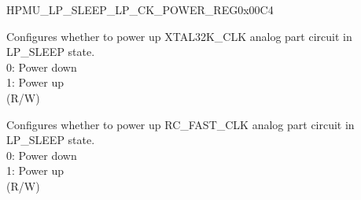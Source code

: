     \begin{register}{H}{PMU\_LP\_SLEEP\_LP\_CK\_POWER\_REG}{0x00C4}\label{regdesc:PMULPSLEEPLPCKPOWERREG}
    \regnewline%
    \begin{regdesc}\begin{reglist}
    \label{fielddesc:PMULPSLEEPXPDXTAL32K}\item [PMU\_LP\_SLEEP\_XPD\_XTAL32K] Configures whether to power up XTAL32K\_CLK analog part circuit in LP\_SLEEP state.\\
0: Power down\\
1: Power up\\
(R/W)
    \label{fielddesc:PMULPSLEEPXPDFOSCCLK}\item [PMU\_LP\_SLEEP\_XPD\_FOSC\_CLK] Configures whether to power up RC\_FAST\_CLK analog part circuit in LP\_SLEEP state.\\
0: Power down\\
1: Power up\\
(R/W)
    \end{reglist}\end{regdesc}
    \end{register}


